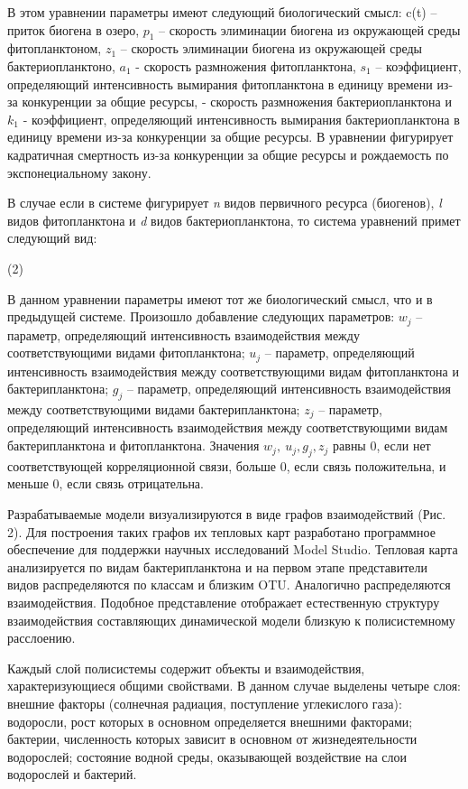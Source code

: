 \documentclass[a4paper,12pt,openany,final]{extreport}
\begin{document}
В этом уравнении параметры имеют следующий биологический смысл: c(t) --
приток биогена в озеро, \(p_{1}\) -- скорость элиминации биогена из
окружающей среды фитопланктоном, \(z_{1}\) -- скорость элиминации
биогена из окружающей среды бактериопланктоно, \(a_{1}\) - скорость
размножения фитопланктона, \(s_{1}\) -- коэффициент, определяющий
интенсивность вымирания фитопланктона в единицу времени из-за
конкуренции за общие ресурсы, - скорость размножения бактериопланктона и
\(k_{1}\) - коэффициент, определяющий интенсивность вымирания
бактериопланктона в единицу времени из-за конкуренции за общие ресурсы.
В уравнении фигурирует кадратичная смертность из-за конкуренции за общие
ресурсы и рождаемость по экспонециальному закону.

В случае если в системе фигурирует \emph{n} видов первичного ресурса
(биогенов), \emph{l} видов фитопланктона и \emph{d} видов
бактериопланктона, то система уравнений примет следующий вид:

(2)

В данном уравнении параметры имеют тот же биологический смысл, что и в
предыдущей системе. Произошло добавление следующих параметров: \(w_{j}\)
-- параметр, определяющий интенсивность взаимодействия между
соответствующими видами фитопланктона; \(u_{j}\) -- параметр,
определяющий интенсивность взаимодействия между соответствующими видам
фитопланктона и бактерипланктона; \(g_{j}\) -- параметр, определяющий
интенсивность взаимодействия между соответствующими видами
бактерипланктона; \(z_{j}\) -- параметр, определяющий интенсивность
взаимодействия между соответствующими видам бактерипланктона и
фитопланктона. Значения \(w_{j},\ u_{j}{,g}_{j},z_{j}\) равны 0, если
нет соответствующей корреляционной связи, больше 0, если связь
положительна, и меньше 0, если связь отрицательна.

Разрабатываемые модели визуализируются в виде графов взаимодействий
(Рис. 2). Для построения таких графов их тепловых карт разработано
программное обеспечение для поддержки научных исследований Model Studio.
Тепловая карта анализируется по видам бактерипланктона и на первом этапе
представители видов распределяются по классам и близким OTU. Аналогично
распределяются взаимодействия. Подобное представление отображает
естественную структуру взаимодействия составляющих динамической модели
близкую к полисистемному расслоению.

Каждый слой полисистемы содержит объекты и взаимодействия,
характеризующиеся общими свойствами. В данном случае выделены четыре
слоя: внешние факторы (солнечная радиация, поступление углекислого
газа): водоросли, рост которых в основном определяется внешними
факторами; бактерии, численность которых зависит в основном от
жизнедеятельности водорослей; состояние водной среды, оказывающей
воздействие на слои водорослей и бактерий.
\end{document}

